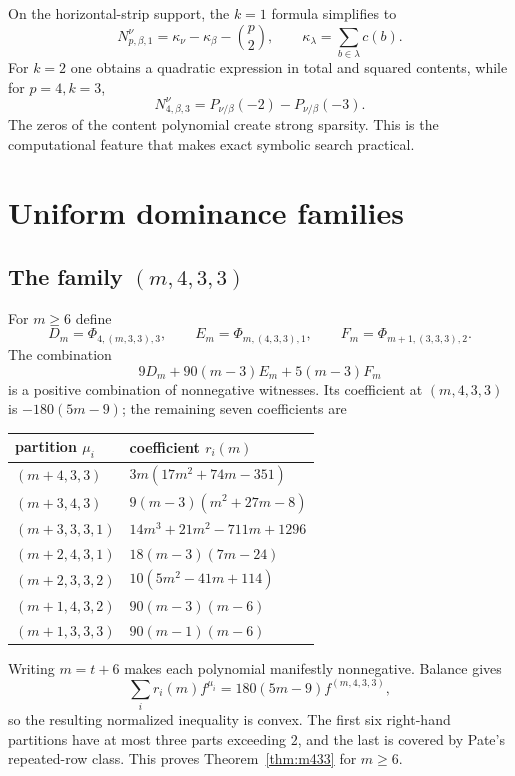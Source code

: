 \documentclass[11pt]{article}
\theoremstyle{definition}
\begin{document}
On the horizontal-strip support, the $k=1$ formula simplifies to
\begin{equation}\label{eq:k1content}
 N^\nu_{p,\beta,1}=\kappa_\nu-\kappa_\beta-\binom p2,
\qquad \kappa_\lambda=\sum_{b\in\lambda}c(b).
\end{equation}
For $k=2$ one obtains a quadratic expression in total and squared contents, while for $p=4,k=3$,
\[
 N^\nu_{4,\beta,3}=P_{\nu/\beta}(-2)-P_{\nu/\beta}(-3).
\]
The zeros of the content polynomial create strong sparsity.  This is the computational feature that makes exact symbolic search practical.

\section{Uniform dominance families}\label{sec:families}
\subsection{\texorpdfstring{The family $(m,4,3,3)$}{The family (m,4,3,3)}}
For $m\ge6$ define
\[
 D_m=\Phi_{4,(m,3,3),3},\qquad
 E_m=\Phi_{m,(4,3,3),1},\qquad
 F_m=\Phi_{m+1,(3,3,3),2}.
\]
The combination
\begin{equation}\label{eq:threewitness}
 9D_m+90(m-3)E_m+5(m-3)F_m
\end{equation}
is a positive combination of nonnegative witnesses.  Its coefficient at $(m,4,3,3)$ is $-180(5m-9)$; the remaining seven coefficients are
\begin{center}\small
\begin{tabular}{ll}
\toprule
partition $\mu_i$ & coefficient $r_i(m)$\\
\midrule
$(m+4,3,3)$ & $3m(17m^2+74m-351)$\\
$(m+3,4,3)$ & $9(m-3)(m^2+27m-8)$\\
$(m+3,3,3,1)$ & $14m^3+21m^2-711m+1296$\\
$(m+2,4,3,1)$ & $18(m-3)(7m-24)$\\
$(m+2,3,3,2)$ & $10(5m^2-41m+114)$\\
$(m+1,4,3,2)$ & $90(m-3)(m-6)$\\
$(m+1,3,3,3)$ & $90(m-1)(m-6)$\\
\bottomrule
\end{tabular}
\end{center}
Writing $m=t+6$ makes each polynomial manifestly nonnegative.  Balance gives
\[
 \sum_i r_i(m)f^{\mu_i}=180(5m-9)f^{(m,4,3,3)},
\]
so the resulting normalized inequality is convex.  The first six right-hand partitions have at most three parts exceeding $2$, and the last is covered by Pate's repeated-row class.  This proves Theorem~\ref{thm:m433} for $m\ge6$.
\end{document}

